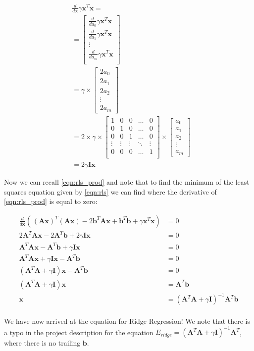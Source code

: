 \documentclass{article}
\newcommand{\x}{\mathbf{x}}
\newcommand{\A}{\mathbf{A}}
\newcommand{\B}{\mathbf{b}} %
\newcommand{\I}{\mathbf{I}}
\begin{document}
\begin{equation}
\begin{split}
    & \frac{d}{d\x} \gamma \x^T \x = \\
    & =
    \begin{bmatrix}
        \frac{d}{d a_0} \gamma \x^T \x \\
        \frac{d}{d a_1} \gamma \x^T \x \\
        \vdots \\
        \frac{d}{d a_m} \gamma \x^T \x \\
    \end{bmatrix}\\
    &= \gamma \times
    \begin{bmatrix}
        2 a_0 \\
        2 a_1 \\
        2 a_2 \\
        \vdots \\
        2 a_m
    \end{bmatrix}\\
    &= 2 \times \gamma \times
    \begin{bmatrix}
        1 & 0 & 0 & \ldots & 0\\
        0 & 1 & 0 & \ldots & 0\\
        0 & 0 & 1 & \ldots & 0\\
        \vdots & \vdots & \vdots & \ddots & \vdots \\
        0 & 0 & 0 & \ldots & 1\\
    \end{bmatrix}
    \times
    \begin{bmatrix}
        a_0 \\
        a_1 \\
        a_2 \\
        \vdots \\
        a_m
    \end{bmatrix}\\
    &= 2 \gamma \I \x
\end{split}
\end{equation}

Now we can recall \ref{eqn:rls_prod} and note that to find the minimum of the least squares equation given by \ref{eqn:rls} we can find where the derivative of \ref{eqn:rls_prod} is equal to zero:

\begin{equation}
\begin{split}
    \frac{d}{d \x} (\frac{}{}(\A\x)^T(\A\x) -2 \B^T \A\x + \B^T \B + \gamma \x^T \x) &= 0 \\
    2 \A ^T \A \x - 2 \A ^T \B + 2 \gamma \I \x &= 0 \\
    \A ^T \A \x - \A ^T \B + \gamma \I \x &= 0 \\
    \A ^T \A \x + \gamma \I \x - \A ^T \B &= 0 \\
    ( \A ^T \A + \gamma \I ) \x - \A ^T \B &= 0 \\
    ( \A ^T \A + \gamma \I ) \x  &= \A ^T \B \\
    \x &= ( \A ^T \A + \gamma \I )^{-1} \A ^T \B  \\
\end{split}
\end{equation}

We have now arrived at the equation for Ridge Regression! We note that there is a typo in the project description for the equation $E_{ridge}=( \A ^T \A + \gamma \I )^{-1} \A ^T$, where there is no trailing $\B$.
\end{document}
